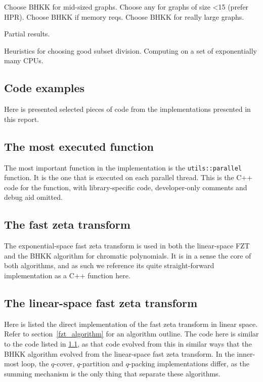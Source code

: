 \documentclass{cslthse-msc}
\newcommand{\code}{\texttt}
\begin{document}
Choose BHKK for mid-sized graphs.
Choose any for graphs of size <15 (prefer HPR).
Choose BHKK if memory reqs.
Choose BHKK for really large graphs.

Partial results.

Heuristics for choosing good subset division.
Computing on a set of exponentially many CPUs.




\begin{appendices}
 \chapter{Code examples}
 Here is presented selected pieces of code from the implementations presented in this report.
 
 \section{The most executed function}\label{fztlin_code}
 The most important function in the implementation is the \code{utils::parallel} function. It is the one that is executed on each parallel thread. This is the C++ code for the function, with library-specific code, developer-only comments and debug aid omitted.
 
 \section{The fast zeta transform}\label{fzt_code}
 The exponential-space fast zeta transform is used in both the linear-space FZT and the BHKK algorithm for chromatic polynomials. It is in a sense the core of both algorithms, and as such we reference its quite straight-forward implementation as a C++ function here.
 
 
 \section{The linear-space fast zeta transform}\label{fztlin_set_code}
 Here is listed the direct implementation of the fast zeta transform in linear space. Refer to section~\ref{fzt_algorithm} for an algorithm outline. The code here is similar to the code listed in \ref{fztlin_code}, as that code evolved from this in similar ways that the BHKK algorithm evolved from the linear-space fast zeta transform. In the inner-most loop, the $q$-cover, $q$-partition and $q$-packing implementations differ, as the summing mechanism is the only thing that separate these algorithms.
 

\end{appendices}
\end{document}
